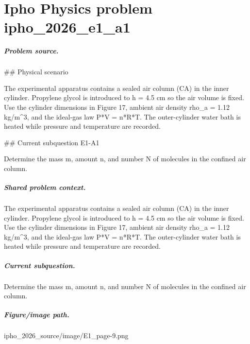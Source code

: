 
\chapter{Ipho Physics problem ipho\_2026\_e1\_a1}
\label{ch:IPhO2026Problems_problem_ipho_2026_e1_a1}

\paragraph{Problem source.}
\#\# Physical scenario

The experimental apparatus contains a sealed air column (CA) in the inner
cylinder.  Propylene glycol is introduced to h = 4.5 cm so the air volume is
fixed.  Use the cylinder dimensions in Figure 17, ambient air density
rho\_a = 1.12 kg/m\textasciicircum{}3, and the ideal-gas law P*V = n*R*T.  The outer-cylinder
water bath is heated while pressure and temperature are recorded.

\#\# Current subquestion E1-A1

Determine the mass m, amount n, and number N of molecules in the confined air column.

\paragraph{Shared problem context.}
The experimental apparatus contains a sealed air column (CA) in the inner
cylinder.  Propylene glycol is introduced to h = 4.5 cm so the air volume is
fixed.  Use the cylinder dimensions in Figure 17, ambient air density
rho\_a = 1.12 kg/m\textasciicircum{}3, and the ideal-gas law P*V = n*R*T.  The outer-cylinder
water bath is heated while pressure and temperature are recorded.

\paragraph{Current subquestion.}
Determine the mass m, amount n, and number N of molecules in the confined air column.

\paragraph{Figure/image path.}
ipho\_2026\_source/image/E1\_page-9.png


